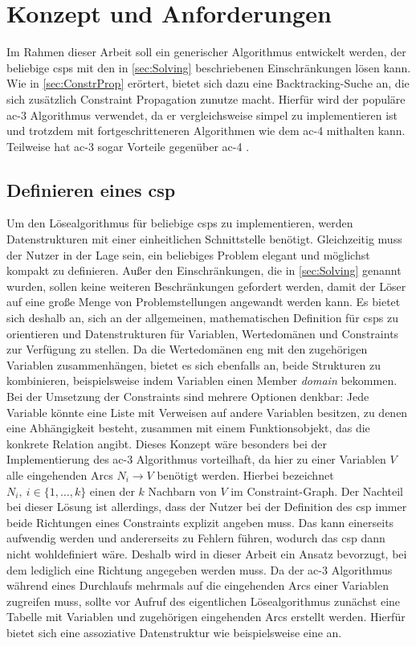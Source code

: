 \section{Konzept und Anforderungen}
\label{sec:Concept}
Im Rahmen dieser Arbeit soll ein generischer Algorithmus entwickelt werden, der beliebige \acp{csp} mit den in \cref{sec:Solving} beschriebenen Einschränkungen lösen kann. Wie in
\cref{sec:ConstrProp} erörtert, bietet sich dazu eine Backtracking-Suche an, die sich zusätzlich Constraint Propagation zunutze macht. Hierfür wird der populäre \ac*{ac}-3
Algorithmus verwendet, da er vergleichsweise simpel zu implementieren ist und trotzdem mit fortgeschritteneren Algorithmen wie dem \ac*{ac}-4 mithalten kann. Teilweise hat
\ac*{ac}-3 sogar Vorteile gegenüber \ac*{ac}-4 \cite{ACAgain}.

\subsection{Definieren eines \ac*{csp}}
\label{sec:CSPDef}
Um den Lösealgorithmus für beliebige \acp{csp} zu implementieren, werden Datenstrukturen mit einer einheitlichen Schnittstelle benötigt. Gleichzeitig muss der Nutzer in der Lage
sein, ein beliebiges Problem elegant und möglichst kompakt zu definieren. Außer den Einschränkungen, die in \cref{sec:Solving} genannt wurden, sollen keine weiteren Beschränkungen
gefordert werden, damit der Löser auf eine große Menge von Problemstellungen angewandt werden kann. Es bietet sich deshalb an, sich an der allgemeinen, mathematischen Definition
für \acp{csp} zu orientieren und Datenstrukturen für Variablen, Wertedomänen und Constraints zur Verfügung zu stellen. Da die Wertedomänen eng mit den zugehörigen Variablen
zusammenhängen, bietet es sich ebenfalls an, beide Strukturen zu kombinieren, beispielsweise indem Variablen einen Member \textit{domain} bekommen. Bei der Umsetzung der
Constraints sind mehrere Optionen denkbar: Jede Variable könnte eine Liste mit Verweisen auf andere Variablen besitzen, zu denen eine Abhängigkeit besteht, zusammen mit einem
Funktionsobjekt, das die konkrete Relation angibt. Dieses Konzept wäre besonders bei der Implementierung des \ac*{ac}-3 Algorithmus vorteilhaft, da hier zu einer Variablen $V$ alle
eingehenden Arcs $N_i \rightarrow V$ benötigt werden. Hierbei bezeichnet $N_i, \ i \in \{1, \dots, k\}$ einen der $k$ Nachbarn von $V$ im Constraint-Graph. Der Nachteil bei dieser
Lösung ist allerdings, dass der Nutzer bei der Definition des \ac*{csp} immer beide Richtungen eines Constraints explizit angeben muss. Das kann einerseits aufwendig werden und
andererseits zu Fehlern führen, wodurch das \ac*{csp} dann nicht wohldefiniert wäre. Deshalb wird in dieser Arbeit ein Ansatz bevorzugt, bei dem lediglich eine Richtung angegeben
werden muss. Da der \ac*{ac}-3 Algorithmus während eines Durchlaufs mehrmals auf die eingehenden Arcs einer Variablen zugreifen muss, sollte vor Aufruf des eigentlichen
Lösealgorithmus zunächst eine Tabelle mit Variablen und zugehörigen eingehenden Arcs erstellt werden. Hierfür bietet sich eine assoziative Datenstruktur wie beispielsweise eine
 an.

